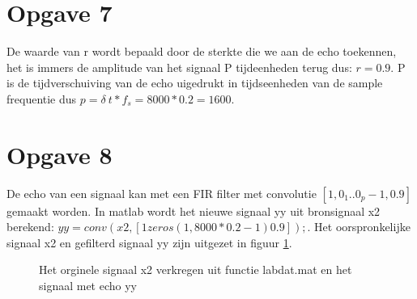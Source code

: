\documentclass{article}
\begin{document}
\section{Opgave 7}
De waarde van r wordt bepaald door de sterkte die we aan de echo toekennen, het is immers de amplitude van het signaal P tijdeenheden terug dus: $r = 0.9$. P is de tijdverschuiving van de echo uigedrukt in tijdseenheden van de sample frequentie dus $p = \delta~t*f_s = 8000 * 0.2 = 1600$.

\section{Opgave 8}
De echo van een signaal kan met een FIR filter met convolutie $[1, 0_1 .. 0_p-1, 0.9]$ gemaakt worden. In matlab wordt het nieuwe signaal yy uit bronsignaal x2 berekend: $yy = conv(x2, [1 zeros(1,8000*0.2 - 1) 0.9]);$. Het oorspronkelijke signaal x2 en gefilterd signaal yy zijn uitgezet in figuur \ref{fig:opgave8}.
\begin{figure}[h]
  \centering
  \caption{Het orginele signaal x2 verkregen uit functie labdat.mat en het signaal met echo yy}
  \label{fig:opgave8}
\end{figure}
\end{document}
